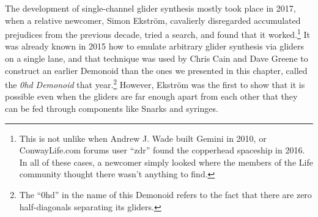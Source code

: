 The development of single-channel glider synthesis mostly took place in 2017, when a relative newcomer, Simon Ekstr{\"o}m, cavalierly disregarded accumulated prejudices from the previous decade, tried a search, and found that it worked.\footnote{This is not unlike when Andrew J. Wade built Gemini in 2010, or ConwayLife.com forums user ``zdr'' found the copperhead spaceship in 2016. In all of these cases, a newcomer simply looked where the members of the Life community thought there wasn't anything to find.} It was already known in 2015 how to emulate arbitrary glider synthesis via gliders on a single lane, and that technique was used by Chris Cain and Dave Greene to construct an earlier Demonoid than the ones we presented in this chapter, called the \emph{0hd Demonoid} that year.\footnote{The ``0hd'' in the name of this Demonoid refers to the fact that there are zero half-diagonals separating its gliders.} However, Ekstr{\"o}m was the first to show that it is possible even when the gliders are far enough apart from each other that they can be fed through components like Snarks and syringes.





